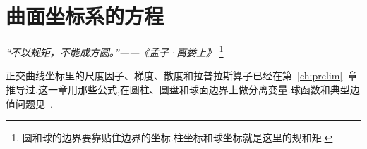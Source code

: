 \chapter{曲面坐标系的方程}

\begin{flushright}
\textit{“不以规矩，不能成方圆。”——《孟子·离娄上》}
\footnote{圆和球的边界要靠贴住边界的坐标.柱坐标和球坐标就是这里的规和矩.}
\end{flushright}

正交曲线坐标里的尺度因子、梯度、散度和拉普拉斯算子已经在第~\ref{ch:prelim}~章推导过.这一章用那些公式,在圆柱、圆盘和球面边界上做分离变量.球函数和典型边值问题见~\cite{jackson,morse,wangzhuxi,ivrii}.





